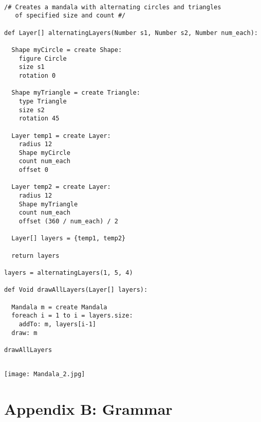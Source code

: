 \documentclass[12pt]{report}
\begin{document}
\begin{verbatim}

/# Creates a mandala with alternating circles and triangles 
   of specified size and count #/

def Layer[] alternatingLayers(Number s1, Number s2, Number num_each):
  
  Shape myCircle = create Shape:
    figure Circle
    size s1
    rotation 0 
    
  Shape myTriangle = create Triangle:
    type Triangle
    size s2
    rotation 45
    
  Layer temp1 = create Layer:
    radius 12
    Shape myCircle
    count num_each
    offset 0
    
  Layer temp2 = create Layer:
    radius 12
    Shape myTriangle
    count num_each
    offset (360 / num_each) / 2
    
  Layer[] layers = {temp1, temp2}
  
  return layers

layers = alternatingLayers(1, 5, 4)

def Void drawAllLayers(Layer[] layers):
  
  Mandala m = create Mandala
  foreach i = 1 to i = layers.size:
    addTo: m, layers[i-1]
  draw: m
  
drawAllLayers
  
\end{verbatim}


\begin{center}
\texttt{[image: Mandala\_2.jpg]}
\end{center}
\newpage
{}
\section*{Appendix B: Grammar}
\end{document}
